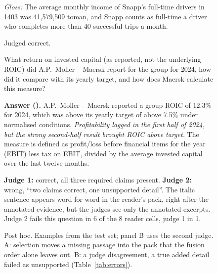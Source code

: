 \begin{figure}[t]
\begin{minipage}[t]{0.495\textwidth}
\begin{tcolorbox}[exs=cLex]
\begin{otherlanguage}{persian}
\end{otherlanguage}
{\color{cAxis}\textit{Gloss:} The average monthly income of Snapp's full-time drivers in 1403 was 41,579,509 toman, and Snapp counts as full-time a driver who completes more than 40 successful trips a month.\par}
Judged correct.
\end{tcolorbox}
\end{minipage}\hfill
\begin{minipage}[t]{0.495\textwidth}
\begin{tcolorbox}[exc, title={B. Two judges disagree on a correct answer (English)}]
What return on invested capital (as reported, not the underlying ROIC) did A.P.\ Moller -- Maersk report for the group for 2024, how did it compare with its yearly target, and how does Maersk calculate this measure?\par
\end{tcolorbox}
\begin{tcolorbox}[exs=cHR]
\textbf{Answer (\lexb{}).} A.P.\ Moller -- Maersk reported a group ROIC of 12.3\% for 2024, which was above its yearly target of above 7.5\% under normalised conditions. \emph{Profitability lagged in the first half of 2024, but the strong second-half result brought ROIC above target.} The measure is defined as profit/loss before financial items for the year (EBIT) less tax on EBIT, divided by the average invested capital over the last twelve months.
\end{tcolorbox}
\begin{tcolorbox}[exs=cSetR]
\textbf{Judge 1:} correct, all three required claims present. \textbf{Judge 2:} wrong, ``two claims correct, one unsupported detail''. The italic sentence appears word for word in the reader's pack, right after the annotated evidence, but the judges see only the annotated excerpts. Judge 2 fails this question in 6 of the 8 reader cells, judge 1 in 1.
\end{tcolorbox}
\end{minipage}
\caption{Post hoc. Examples from the test set; panel B uses the second judge. A: selection moves a missing passage into the pack that the fusion order alone leaves out. B: a judge disagreement, a true added detail failed as unsupported (Table~\ref{tab:errors}).}
\label{fig:examples}
\end{figure}
